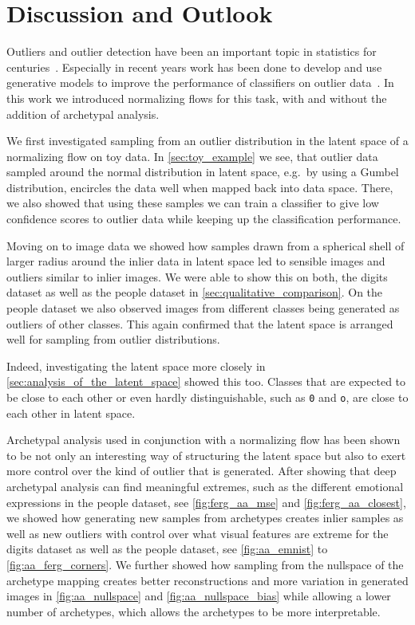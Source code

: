\chapter{Discussion and Outlook}%
\label{cha:discussion}

Outliers and outlier detection have been an important topic in statistics for
centuries~\citep{zimekThereBackAgain2018}. Especially in recent years work has
been done to develop and use generative models to improve the performance of
classifiers on outlier
data~\citep{meinkeNeuralNetworksThat2019,schottFirstAdversariallyRobust2018,leeTrainingConfidencecalibratedClassifiers2018}.
In this work we introduced normalizing flows for this task, with and without
the addition of archetypal analysis.

We first investigated sampling from an outlier distribution in the latent space
of a normalizing flow on toy data. In \autoref{sec:toy_example} we see, that
outlier data sampled around the normal distribution in latent space, e.g.\ by
using a Gumbel distribution, encircles the data well when mapped back into data
space. There, we also showed that using these samples we can train a classifier
to give low confidence scores to outlier data while keeping up the
classification performance.

Moving on to image data we showed how samples drawn from a spherical shell of
larger radius around the inlier data in latent space led to sensible images and
outliers similar to inlier images. We were able to show this on both, the
digits dataset as well as the people dataset in
\autoref{sec:qualitative_comparison}. On the people dataset we also
observed images from different classes being generated as outliers of other
classes. This again confirmed that the latent space is arranged well for
sampling from outlier distributions.

Indeed, investigating the latent space more closely in
\autoref{sec:analysis_of_the_latent_space} showed this too. Classes that are
expected to be close to each other or even hardly distinguishable, such as
\texttt{0} and \texttt{o}, are close to each other in latent space.

Archetypal analysis used in conjunction with a normalizing flow has been shown
to be not only an interesting way of structuring the latent space but also to
exert more control over the kind of outlier that is generated. After showing
that deep archetypal analysis can find meaningful extremes, such as the
different emotional expressions in the people dataset, see
\autoref{fig:ferg_aa_mse} and \autoref{fig:ferg_aa_closest}, we showed how
generating new samples from archetypes creates inlier samples as well as new
outliers with control over what visual features are extreme for the digits
dataset as well as the people dataset, see \autoref{fig:aa_emnist} to
\autoref{fig:aa_ferg_corners}. We further showed how sampling from the
nullspace of the archetype mapping creates better reconstructions and more
variation in generated images in \autoref{fig:aa_nullspace} and
\autoref{fig:aa_nullspace_bias} while allowing a lower number of archetypes,
which allows the archetypes to be more interpretable.

